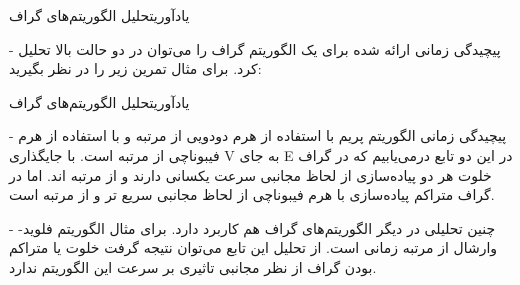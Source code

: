 \begin{itemframe}{یادآوری}{تحلیل الگوریتم‌های گراف}
\item[-]
پیچیدگی زمانی ارائه شده برای یک الگوریتم گراف را می‌توان در دو حالت بالا تحلیل کرد. برای مثال تمرین زیر را در نظر بگیرید:

\end{itemframe}

\begin{itemframe}{یادآوری}{تحلیل الگوریتم‌های گراف}
\item[-]
پیچیدگی زمانی الگوریتم پریم با استفاده از هرم دودویی از مرتبه
و با استفاده از هرم فیبوناچی از مرتبه
است. با جایگذاری V به جای E در این دو تابع درمی‌یابیم که در گراف خلوت هر دو پیاده‌سازی‌ از لحاظ مجانبی سرعت یکسانی دارند و از مرتبه
اند. اما در گراف متراکم پیاده‌سازی با هرم فیبوناچی از لحاظ مجانبی سریع تر و از مرتبه
 است.
\item[-]
چنین تحلیلی در دیگر الگوریتم‌‌های گراف هم کاربرد دارد. برای مثال الگوریتم فلوید-وارشال از مرتبه زمانی
 است. از تحلیل این تابع می‌توان نتیجه گرفت خلوت یا متراکم بودن گراف از نظر مجانبی تاثیری بر سرعت این الگوریتم ندارد.
\end{itemframe}



